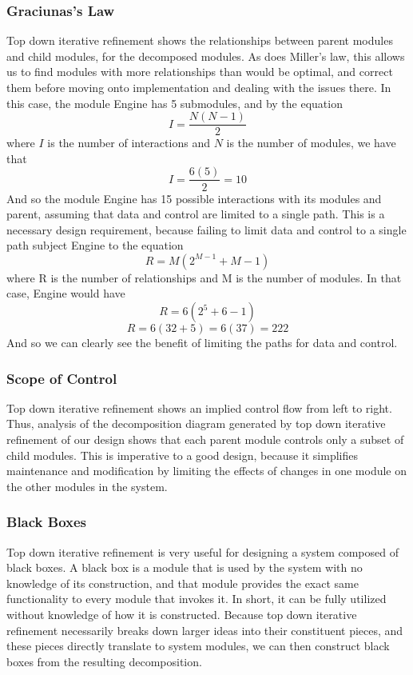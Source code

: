 \documentclass{article}
\begin{document}
		\subsubsection{Graciunas's Law}
			Top down iterative refinement shows the relationships between parent modules and child modules, for the decomposed modules. As does Miller's law, this allows us to find modules with more relationships than would be optimal, and correct them before moving onto implementation and dealing with the issues there. In this case, the module Engine has 5 submodules, and by the equation 
			$$I = \frac{N(N - 1)}{2}$$
			where $I$ is the number of interactions and $N$ is the number of modules, we have that
			$$I = \frac{6(5)}{2} = 10$$
			And so the module Engine has 15 possible interactions with its modules and parent, assuming that data and control are limited to a single path. This is a necessary design requirement, because failing to limit data and control to a single path subject Engine to the equation
			$$R = M(2^{M-1} + M - 1)$$
			where R is the number of relationships and M is the number of modules. In that case, Engine would have 
			$$R = 6(2^5 + 6 - 1)$$
			$$R = 6(32 + 5) = 6(37) = 222$$
			And so we can clearly see the benefit of limiting the paths for data and control.  
		\subsubsection{Scope of Control}
			Top down iterative refinement shows an implied control flow from left to right. Thus, analysis of the decomposition diagram generated by top down iterative refinement of our design shows that each parent module controls only a subset of child modules. This is imperative to a good design, because it simplifies maintenance and modification by limiting the effects of changes in one module on the other modules in the system. 
		\subsubsection{Black Boxes}
			Top down iterative refinement is very useful for designing a system composed of black boxes. A black box is a module that is used by the system with no knowledge of its construction, and that module provides the exact same functionality to every module that invokes it. In short, it can be fully utilized without knowledge of how it is constructed. Because top down iterative refinement necessarily breaks down larger ideas into their constituent pieces, and these pieces directly translate to system modules, we can then construct black boxes from the resulting decomposition. 
\end{document}
